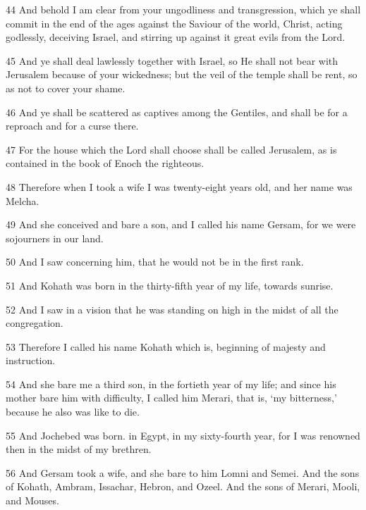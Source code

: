\par 44 And behold I am clear from your ungodliness and transgression, which ye shall commit in the end of the ages against the Saviour of the world, Christ, acting godlessly, deceiving Israel, and stirring up against it great evils from the Lord.

\par 45 And ye shall deal lawlessly together with Israel, so He shall not bear with Jerusalem because of your wickedness; but the veil of the temple shall be rent, so as not to cover your shame.

\par 46 And ye shall be scattered as captives among the Gentiles, and shall be for a reproach and for a curse there.

\par 47 For the house which the Lord shall choose shall be called Jerusalem, as is contained in the book of Enoch the righteous.

\par 48 Therefore when I took a wife I was twenty-eight years old, and her name was Melcha.

\par 49 And she conceived and bare a son, and I called his name Gersam, for we were sojourners in our land.

\par 50 And I saw concerning him, that he would not be in the first rank.

\par 51 And Kohath was born in the thirty-fifth year of my life, towards sunrise.

\par 52 And I saw in a vision that he was standing on high in the midst of all the congregation.

\par 53 Therefore I called his name Kohath which is, beginning of majesty and instruction.

\par 54 And she bare me a third son, in the fortieth year of my life; and since his mother bare him with difficulty, I called him Merari, that is, ‘my bitterness,’ because he also was like to die.

\par 55 And Jochebed was born. in Egypt, in my sixty-fourth year, for I was renowned then in the midst of my brethren.

\par 56 And Gersam took a wife, and she bare to him Lomni and Semei. And the sons of Kohath, Ambram, Issachar, Hebron, and Ozeel. And the sons of Merari, Mooli, and Mouses.


